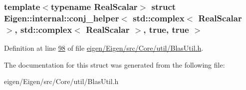 \subsubsection*{template$<$typename Real\+Scalar$>$\newline
struct Eigen\+::internal\+::conj\+\_\+helper$<$ std\+::complex$<$ Real\+Scalar $>$, std\+::complex$<$ Real\+Scalar $>$, true, true $>$}



Definition at line \hyperlink{eigen_2_eigen_2src_2_core_2util_2_blas_util_8h_source_l00098}{98} of file \hyperlink{eigen_2_eigen_2src_2_core_2util_2_blas_util_8h_source}{eigen/\+Eigen/src/\+Core/util/\+Blas\+Util.\+h}.



The documentation for this struct was generated from the following file\+:\begin{DoxyCompactItemize}
\item 
eigen/\+Eigen/src/\+Core/util/\+Blas\+Util.\+h\end{DoxyCompactItemize}
